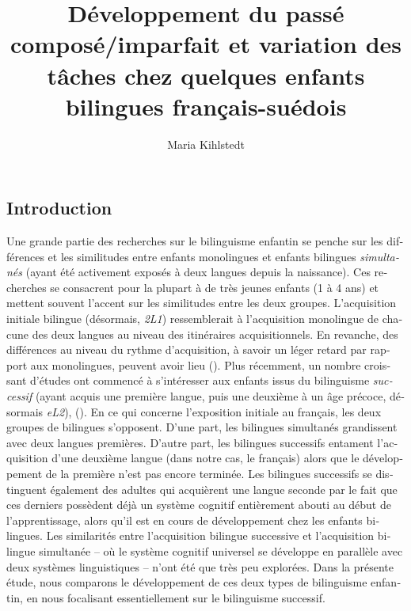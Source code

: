 \documentclass[french, output=paper]{langscibook}
\author{Maria Kihlstedt\orcid{}\affiliation{Université de Paris-Nanterre}}
\title[Passé composé/imparfait chez des enfants bilingues français-suédois]
      {Développement du passé composé\slash imparfait et variation des tâches chez quelques enfants bilingues français-suédois}
\begin{document}
\begin{otherlanguage}{french}
\lsFrenchChapterSettings{}
\AffiliationsWithoutIndexing{}
\maketitle 
 

\section{Introduction}\largerpage
Une grande partie des recherches sur le bilinguisme enfantin se penche sur les différences et les similitudes entre enfants monolingues et enfants bilingues \textit{simultanés} (ayant été activement exposés à deux langues depuis la naissance). Ces recherches se consacrent pour la plupart à de très jeunes enfants (1 à 4 ans) et mettent souvent l’accent sur les similitudes entre les deux groupes. L’acquisition initiale bilingue (désormais, \textit{2L1}) ressemblerait à l’acquisition monolingue de chacune des deux langues au niveau des itinéraires  acquisitionnels. En revanche, des différences au niveau du rythme d’acquisition, à savoir un léger retard par rapport aux monolingues, peuvent avoir lieu (\citealt{SchlyterHâkansson1994, Genesee2003, DeHouwer2005}). Plus récemment, un nombre croissant d’études ont commencé à s’intéresser aux enfants issus du bilinguisme \textit{successif} (ayant acquis une première langue, puis une deuxième à un âge précoce, désormais \textit{eL2}), (\citealt{GranfeldtEtAl2007, Paradis2007, Kihlstedt2009, Meisel2009, TracyThoma2009, Schlyter2011, Unsworth2016}). En ce qui concerne l’exposition initiale au français, les deux groupes de bilingues s’opposent. D’une part, les bilingues simultanés grandissent avec deux langues premières. D’autre part, les bilingues successifs entament l’acquisition d’une deuxième langue (dans notre cas, le français) alors que le développement de la première n’est pas encore terminée. Les bilingues successifs se distinguent également des adultes qui acquièrent une langue seconde par le fait que ces derniers possèdent déjà un système cognitif entièrement abouti au début de l’apprentissage, alors qu’il est en cours de développement chez les enfants bilingues. Les similarités entre l’acquisition bilingue successive et l’acquisition bilingue simultanée -- où le système cognitif universel se développe en parallèle avec deux systèmes linguistiques -- n’ont été que très peu explorées. Dans la présente étude, nous comparons le développement de ces deux types de bilinguisme enfantin, en nous focalisant essentiellement sur le bilinguisme successif.


\end{otherlanguage}
\end{document}
